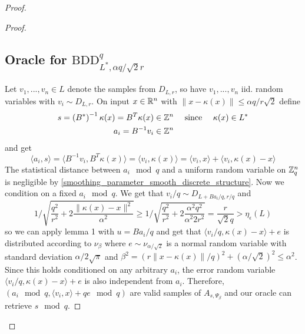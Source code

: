 \begin{proof}
\begin{proof}
\subsection{Oracle for $\mathrm{BDD}_{L^*, \alpha q / \sqrt{2}r}^q$}
Let $v_1, ..., v_n \in L$ denote the samples from $D_{L, r}$, so have $v_1, ..., v_n$ iid. random variables with $v_i \sim D_{L, r}$. On input $x \in \mathbb{R}^n$ with $\| x - \kappa(x) \| \leq \alpha q / r\sqrt{2}$ define
\begin{equation}
\begin{split}
s = \left(B^*\right)^{-1} \kappa(x) = B^T \kappa(x) &\in \mathbb{Z}^n \quad \text{ since } \quad \kappa(x) \in L^* \\
a_i = B^{-1} v_i &\in \mathbb{Z}^n \nonumber
\end{split}
\end{equation}
and get
\begin{equation}
\langle a_i, s \rangle = \langle B^{-1}v_i, B^T \kappa(x) \rangle = \langle v_i, \kappa(x) \rangle = \langle v_i, x \rangle + \langle v_i, \kappa(x) - x \rangle \nonumber
\end{equation}
The statistical distance between $a_i \mod q$ and a uniform random variable on $\mathbb{Z}_q^n$ is negligible by \ref{smoothing_parameter_smooth_discrete_structure}.
Now we condition on a fixed $a_i \mod q$. We get that $v_i / q \sim D_{L + Ba_i / q, r / q}$ and
\begin{equation}
1 / \sqrt{\frac {q^2} {r^2} + 2\frac {\| \kappa(x) - x \|^2} {\alpha^2}} \geq 1 / \sqrt{\frac {q^2} {r^2} + 2 \frac {\alpha^2 q^2} {\alpha^2 2 r^2} } = \frac r {\sqrt{2}q} > \eta_\epsilon(L) \nonumber
\end{equation}
so we can apply lemma 1 with $u = Ba_i / q$ and get that $\langle v_i / q, \kappa(x) - x \rangle + e$ is distributed according to $\nu_\beta$ where $e \sim \nu_{\alpha / \sqrt{2}}$ is a normal random variable with standard deviation $\alpha / 2\sqrt{\pi}$ and $\beta^2 = (r\| x - \kappa(x) \| / q)^2 + (\alpha/\sqrt{2})^2 \leq \alpha^2$. Since this holds conditioned on any arbitrary $a_i$, the error random variable $\langle v_i / q, \kappa(x) - x \rangle + e$ is also independent from $a_i$. Therefore, $(a_i \mod q, \langle v_i, x \rangle + qe \mod q)$ are valid samples of $A_{s, \Psi_\beta}$ and our oracle can retrieve $s \mod q$.


\end{proof}
\end{proof}
